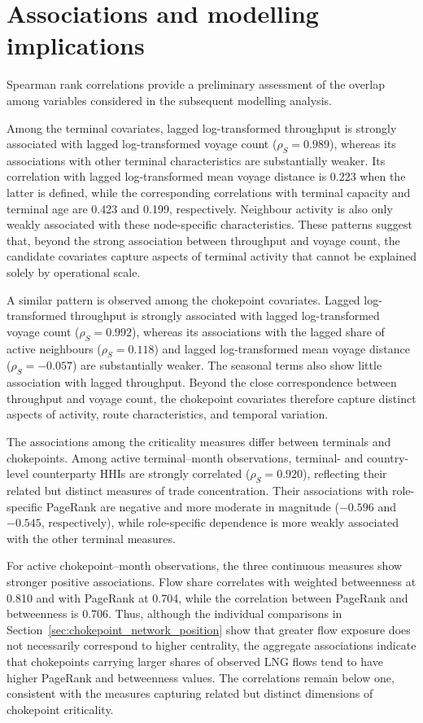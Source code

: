 \documentclass[pdftex,12pt,openright,a4paper,oneside]{book}
\begin{document}
\section{Associations and modelling implications}
\label{sec:associations_variable_selection}

Spearman rank correlations provide a preliminary assessment of the overlap among variables considered in the subsequent modelling analysis. 

Among the terminal covariates, lagged log-transformed throughput is strongly associated with lagged log-transformed voyage count (\(\rho_S=0.989\)), whereas its associations with other terminal characteristics are substantially weaker. 
Its correlation with lagged log-transformed mean voyage distance is 0.223 when the latter is defined, while the corresponding correlations with terminal capacity and terminal age are 0.423 and 0.199, respectively. 
Neighbour activity is also only weakly associated with these node-specific characteristics. 
These patterns suggest that, beyond the strong association between throughput and voyage count, the candidate covariates capture aspects of terminal activity that cannot be explained solely by operational scale.

A similar pattern is observed among the chokepoint covariates. 
Lagged log-transformed throughput is strongly associated with lagged log-transformed voyage count (\(\rho_S=0.992\)), whereas its associations with the lagged share of active neighbours (\(\rho_S=0.118\)) and lagged log-transformed mean voyage distance (\(\rho_S=-0.057\)) are substantially weaker. 
The seasonal terms also show little association with lagged throughput. 
Beyond the close correspondence between throughput and voyage count, the chokepoint covariates therefore capture distinct aspects of activity, route characteristics, and temporal variation.

The associations among the criticality measures differ between terminals and chokepoints. 
Among active terminal--month observations, terminal- and country-level counterparty HHIs are strongly correlated ($\rho_S=0.920$), reflecting their related but distinct measures of trade concentration. 
Their associations with role-specific PageRank are negative and more moderate in magnitude ($-0.596$ and $-0.545$, respectively), while role-specific dependence is more weakly associated with the other terminal measures. 

For active chokepoint--month observations, the three continuous measures show stronger positive associations. 
Flow share correlates with weighted betweenness at 0.810 and with PageRank at 0.704, while the correlation between PageRank and betweenness is 0.706. 
Thus, although the individual comparisons in Section~\ref{sec:chokepoint_network_position} show that greater flow exposure does not necessarily correspond to higher centrality, the aggregate associations indicate that chokepoints carrying larger shares of observed LNG flows tend to have higher PageRank and betweenness values. 
The correlations remain below one, consistent with the measures capturing related but distinct dimensions of chokepoint criticality.
\end{document}
